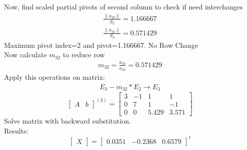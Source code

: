 \documentclass{article}
\begin{document}
Now, find scaled partial pivots of second column to check if need interchanges
\begin{align}
	\frac{\|a_{22}\|}{S_{2}}=1.166667\\
	\frac{\|a_{32}\|}{S_{3}}=0.571429
\end{align}
Maximum pivot index=2 and pivot=1.166667. No Row Change\\
Now calculate $m_{32}$ to reduce row 
\begin{align}
	m_{32}=\frac{a_{32}}{a_{22}}=0.571429
\end{align}
Apply this operations on matrix:
\begin{align}
	E_{3}-m_{32}*E_{2}\rightarrow E_{3}
\end{align}
\[
\left[
\begin{array}{c|c}
A&b
\end{array}
\right]^{(3)}
=
\left[
\begin{array}{ccc|c}
	3&-1&1&1\\
	0&7&1&-1\\
	0&0&5.429&3.571 
\end{array}
\right]
\]
Solve matrix with backward substitution.\\
Results:
\[
\begin{bmatrix}
X
\end{bmatrix}
=
\begin{bmatrix}
	0.0351&-0.2368&0.6579
\end{bmatrix}^t
\]
\end{document}
